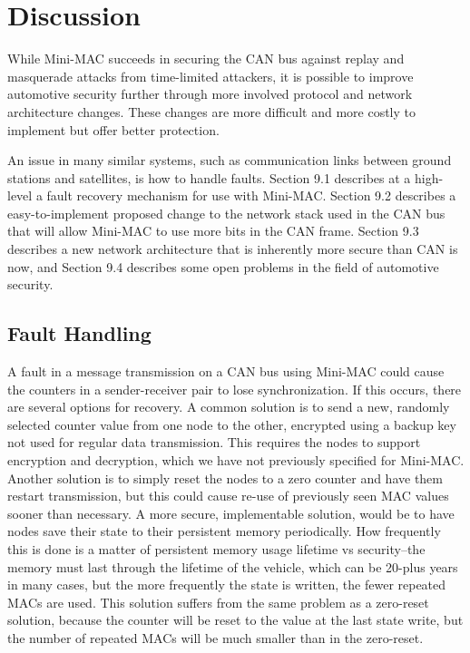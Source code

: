 \section{Discussion}
\label{discuss}

While Mini-MAC succeeds in securing the CAN bus against replay and masquerade attacks from time-limited attackers, it is possible to improve automotive security further through more involved protocol and network architecture changes. These changes are more difficult and more costly to implement but offer better protection. 

An issue in many similar systems, such as communication links between ground stations and satellites, is how to handle faults. Section 9.1 describes at a high-level a fault recovery mechanism for use with Mini-MAC. Section 9.2 describes a easy-to-implement proposed change to the network stack used in the CAN bus that will allow Mini-MAC to use more bits in the CAN frame. Section 9.3 describes a new network architecture that is inherently more secure than CAN is now, and Section 9.4 describes some open problems in the field of automotive security.

\subsection{Fault Handling}
A fault in a message transmission on a CAN bus using Mini-MAC could cause the counters in a sender-receiver pair to lose synchronization. If this occurs, there are several options for recovery. A common solution is to send a new, randomly selected counter value from one node to the other, encrypted using a backup key not used for regular data transmission. This requires the nodes to support encryption and decryption, which we have not previously specified for Mini-MAC. Another solution is to simply reset the nodes to a zero counter and have them restart transmission, but this could cause re-use of previously seen MAC values sooner than necessary. A more secure, implementable solution, would be to have nodes save their state to their persistent memory periodically. How frequently this is done is a matter of persistent memory usage lifetime vs security--the memory must last through the lifetime of the vehicle, which can be 20-plus years in many cases, but the more frequently the state is written, the fewer repeated MACs are used. This solution suffers from the same problem as a zero-reset solution, because the counter will be reset to the value at the last state write, but the number of repeated MACs will be much smaller than in the zero-reset.

